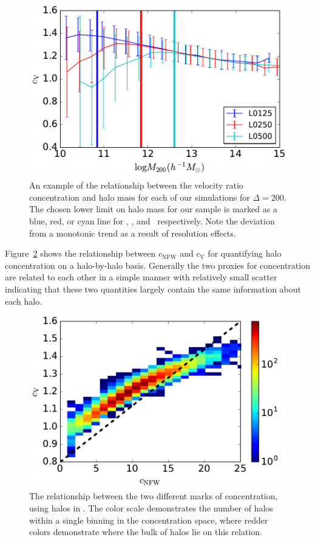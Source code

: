 \documentclass[usenatbib,usegraphicx,letterpaper]{mn2e}
\begin{document}
\begin{figure}
\centering
\includegraphics[width=.5\textwidth]{masscut_cV_d200.pdf}
\caption{An example of the relationship between the velocity ratio concentration and halo mass for each of our simulations for $\Delta =200$. The chosen lower limit on halo mass for our sample is marked as a blue, red, or cyan line for \simA, \simB, and \simC \ respectively. Note the deviation from a monotonic trend as a result of resolution effects.}
\label{fig:cvrelation}
\end{figure}

Figure~\ref{fig:concentrations} shows the relationship between $c_{\mathrm{NFW}}$ and $c_{\mathrm{V}}$ for
quantifying halo concentration on a halo-by-halo basis. Generally the two proxies for concentration are related
to each other in a simple manner with relatively small scatter indicating that these two quantities largely
contain the same information about each halo.

\begin{figure}
\centering
\includegraphics[width=.5\textwidth]{cvvscnfw_relation.pdf}
\caption{
The relationship between the two different marks of concentration, using halos in \simB. The color scale demonstrates the number of halos within a single binning in the concentration space, where redder colors demonstrate where the bulk of halos lie on this relation. 
}
\label{fig:concentrations}
\end{figure}
\end{document}
